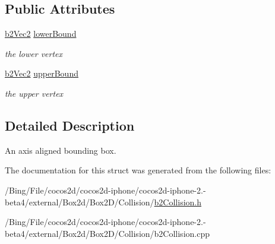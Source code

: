 \subsection*{Public Attributes}
\begin{DoxyCompactItemize}
\item 
\hypertarget{structb2_a_a_b_b_ab94b68fbad8348b22b0522469b11bdb5}{\hyperlink{structb2_vec2}{b2\-Vec2} \hyperlink{structb2_a_a_b_b_ab94b68fbad8348b22b0522469b11bdb5}{lower\-Bound}}\label{structb2_a_a_b_b_ab94b68fbad8348b22b0522469b11bdb5}

\begin{DoxyCompactList}\small\item\em the lower vertex \end{DoxyCompactList}\item 
\hypertarget{structb2_a_a_b_b_ad4a8ec483ba13a2c02918b01d058a18f}{\hyperlink{structb2_vec2}{b2\-Vec2} \hyperlink{structb2_a_a_b_b_ad4a8ec483ba13a2c02918b01d058a18f}{upper\-Bound}}\label{structb2_a_a_b_b_ad4a8ec483ba13a2c02918b01d058a18f}

\begin{DoxyCompactList}\small\item\em the upper vertex \end{DoxyCompactList}\end{DoxyCompactItemize}


\subsection{Detailed Description}
An axis aligned bounding box. 

The documentation for this struct was generated from the following files\-:\begin{DoxyCompactItemize}
\item 
/\-Bing/\-File/cocos2d/cocos2d-\/iphone/cocos2d-\/iphone-\/2.-\/beta4/external/\-Box2d/\-Box2\-D/\-Collision/\hyperlink{b2_collision_8h}{b2\-Collision.\-h}\item 
/\-Bing/\-File/cocos2d/cocos2d-\/iphone/cocos2d-\/iphone-\/2.-\/beta4/external/\-Box2d/\-Box2\-D/\-Collision/b2\-Collision.\-cpp\end{DoxyCompactItemize}
